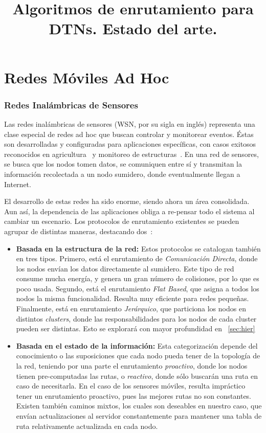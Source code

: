 \documentclass[10pt,preprint,onecolumn]{article}
\title{Algoritmos de enrutamiento para DTNs. Estado del arte.}
\author{}
\date{}
\begin{document}
\maketitle

\section{Redes Móviles Ad Hoc}
\label{sec:manet}

\subsubsection{Redes Inalámbricas de Sensores}
Las redes inalámbricas de sensores (WSN, por su sigla en inglés) representa una clase especial de redes ad hoc que buscan controlar y monitorear eventos. Éstas son desarrolladas y configuradas para aplicaciones específicas, con casos exitosos reconocidos en agricultura~\cite{agric} y monitoreo de estructuras~\cite{struct}. En una red de sensores, se busca que los nodos tomen datos, se comuniquen entre sí y transmitan la información recolectada a un nodo sumidero, donde eventualmente llegan a Internet.

El desarrollo de estas redes ha sido enorme, siendo ahora un área consolidada. Aun así, la dependencia de las aplicaciones obliga a re-pensar todo el sistema al cambiar un escenario. Los protocolos de enrutamiento existentes se pueden agrupar de distintas maneras, destacando dos~\cite{survey2}:

\begin{itemize}
\item \textbf{Basada en la estructura de la red:} Estos protocolos se catalogan también en tres tipos. Primero, está el enrutamiento de \emph{Comunicación Directa}, donde los nodos envían los datos directamente al sumidero. Este tipo de red consume mucha energía, y genera un gran número de colisiones, por lo que es poco usada. Segundo, está el enrutamiento \emph{Flat Based}, que asigna a todos los nodos la misma funcionalidad. Resulta muy eficiente para redes pequeñas. Finalmente, está en enrutamiento \emph{Jerárquico}, que particiona los nodos en distintos \emph{clusters}, donde las responsabilidades para los nodos de cada cluster pueden ser distintas. Esto se explorará con mayor profundidad en ~\ref{sec:hier}

\item \textbf{Basada en el estado de la información:} Esta categorización depende del conocimiento o las suposiciones que cada nodo pueda tener de la topología de la red, teniendo por una parte el enrutamiento \emph{proactivo}, donde los nodos tienen pre-computadas las rutas, o \emph{reactivo}, donde sólo buscarán una ruta en caso de necesitarla. En el caso de los sensores móviles, resulta impráctico tener un enrutamiento proactivo, pues las mejores rutas no son constantes. Existen también caminos mixtos, los cuales son deseables en nuestro caso, que envían actualizaciones al servidor constantemente para mantener una tabla de ruta relativamente actualizada en cada nodo.

\end{itemize}
\end{document}
